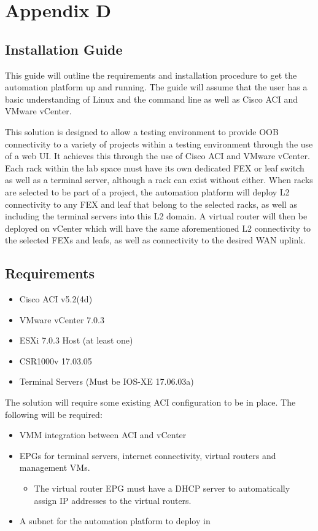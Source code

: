 \chapter{Appendix D}
\label{chap:appendix-d}
\section*{Installation Guide}
\label{sec:installation-guide}
This guide will outline the requirements and installation procedure to get the automation platform up and running. The guide will assume that the user has a basic understanding of Linux and the command line as well as Cisco ACI and VMware vCenter.

This solution is designed to allow a testing environment to provide OOB connectivity to a variety of projects within a testing environment through the use of a web UI. It achieves this through the use of Cisco ACI and VMware vCenter. Each rack within the lab space must have its own dedicated FEX or leaf switch as well as a terminal server, although a rack can exist without either. When racks are selected to be part of a project, the automation platform will deploy L2 connectivity to any FEX and leaf that belong to the selected racks, as well as including the terminal servers into this L2 domain. A virtual router will then be deployed on vCenter which will have the same aforementioned L2 connectivity to the selected FEXs and leafs, as well as connectivity to the desired WAN uplink. 

\section*{Requirements}
\begin{itemize}
    \item Cisco ACI v5.2(4d)
    \item VMware vCenter 7.0.3
    \item ESXi 7.0.3 Host (at least one)
    \item CSR1000v 17.03.05
    \item Terminal Servers (Must be IOS-XE 17.06.03a)
\end{itemize}

The solution will require some existing ACI configuration to be in place. The following will be required:

\begin{itemize}
    \item VMM integration between ACI and vCenter
    \item EPGs for terminal servers, internet connectivity, virtual routers and management VMs.
    \begin{itemize}
        \item The virtual router EPG must have a DHCP server to automatically assign IP addresses to the virtual routers.
    \end{itemize}
    \item A subnet for the automation platform to deploy in
\end{itemize}